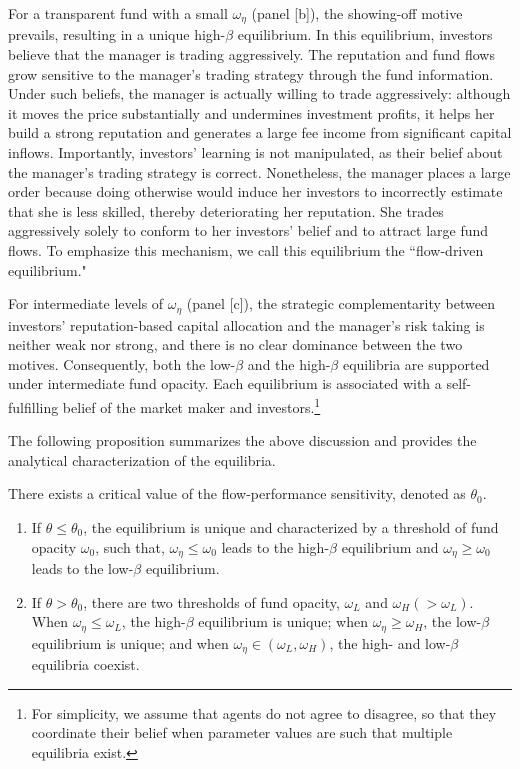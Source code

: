 For a transparent fund with a small $\omega_{\eta}$ (panel [b]), the showing-off motive prevails, resulting in a unique high-$\beta$ equilibrium. In this equilibrium, investors believe that the manager is trading aggressively. The reputation and fund flows grow sensitive to the manager's trading strategy through the fund information. Under such beliefs, the manager is actually willing to trade aggressively: although it moves the price substantially and undermines investment profits, it helps her build a strong reputation and generates a large fee income from significant capital inflows. Importantly, investors' learning is not manipulated, as their belief about the manager's trading strategy is correct. Nonetheless, the manager places a large order because doing otherwise would induce her investors to incorrectly estimate that she is less skilled, thereby deteriorating her reputation. She trades aggressively solely to conform to her investors' belief and to attract large fund flows. To emphasize this mechanism, we call this equilibrium the ``flow-driven equilibrium."

For intermediate levels of $\omega_{\eta}$ (panel [c]), the strategic complementarity between investors' reputation-based capital allocation and the manager's risk taking is neither weak nor strong, and there is no clear dominance between the two motives. Consequently, both the low-$\beta$ and the high-$\beta$ equilibria are supported under intermediate fund opacity. Each equilibrium is associated with a self-fulfilling belief of the market maker and investors.\footnote{For simplicity, we assume that agents do not agree to disagree, so that they coordinate their belief when parameter values are such that multiple equilibria exist.}

The following proposition summarizes the above discussion and provides the analytical characterization of the equilibria.

\begin{proposition}\label{prop:eqm}
There exists a critical value of the flow-performance sensitivity, denoted as $\theta_{0}$.
\begin{enumerate}[label=(\roman*)]
	\item If $\theta\le \theta_{0}$, the equilibrium is unique and characterized by a threshold of fund opacity $\omega_{0}$, such that, $\omega_{\eta}\leq \omega_{0}$ leads to the high-$\beta$ equilibrium and $\omega_{\eta}\ge\omega_{0}$ leads to the low-$\beta$ equilibrium. 
	\item If $\theta> \theta_{0}$, there are two thresholds of fund opacity, $\omega_{L}$ and $\omega_{H}(>\omega_{L})$. When $\omega_{\eta}\leq \omega_{L}$, the high-$\beta$ equilibrium is unique; when $\omega_{\eta}\ge\omega_{H}$, the low-$\beta$ equilibrium is unique; and when $\omega_{\eta}\in(\omega_{L},\omega_{H})$, the high- and low-$\beta$ equilibria coexist.
\end{enumerate}
\end{proposition}

